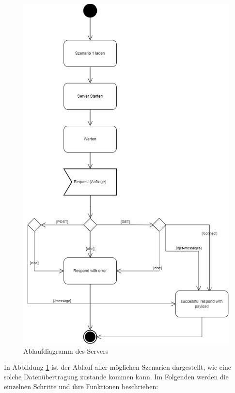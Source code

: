 \begin{figure}[h]
    \centering
    \includegraphics[scale=0.3]{images/serverStart.png}
    \caption{Ablaufdiagramm des Servers}
    \label{fig:protokoll}
\end{figure}


In Abbildung \ref{fig:protokoll} ist der Ablauf aller möglichen Szenarien dargestellt, wie eine solche Datenübertragung
zustande kommen kann. Im Folgenden werden die einzelnen Schritte und ihre Funktionen beschrieben:

